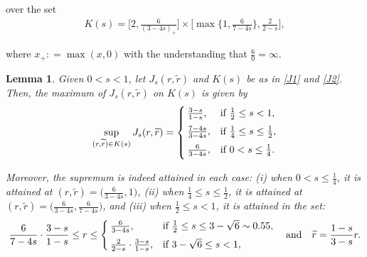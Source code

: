 \documentclass[letterpaper, 11pt,  reqno]{amsart}
\newtheorem{lemma}[theorem]{Lemma}
\newcommand{\1}{\hspace{0.5mm}\text{I}\hspace{0.5mm}}
\newcommand{\noi}{\noindent}
\newcommand{\wt}{\widetilde}
\numberwithin{equation}{section}
\numberwithin{theorem}{section}
\begin{document}
\noi
over the set 
\begin{align}
 K(s)= \bigg[ 2,\frac{6}{(3-4s)_+}\bigg] \times \bigg[\max\Big\{1,\frac{6}{7-4s}\Big\}, \frac{2}{2-s}\bigg],   
\label{J2}
\end{align}


\noi
where $x_+ : = \max(x, 0)$ 
with the understanding that $\frac60 = \infty$.


\begin{lemma}\label{LEM:max} 
Given $0<s<1$, let 
$ J_s(r,\wt r)$ and 
$K(s)$ be as in \eqref{J1} and \eqref{J2}.
Then, the maximum of  $ J_s(r,\wt r)$  on $K(s)$ is given by 
\[  \sup_{(r, \wt r) \in K(s)}  J_s(r, \wt r)
= \begin{cases}
\rule[-3mm]{0pt}{0pt}
 \frac{3-s}{1-s}, & \text{if }  \frac12 \leq s < 1, \\
\rule[-3mm]{0pt}{0pt}
 \frac{7-4s}{3-4s}, & \text{if } \frac14 \le s \le \frac12, \\
\rule[-2.5mm]{0pt}{0pt}
 \frac{6}{3-4s}, & \text{if } 0 < s \le \frac14. 
\end{cases}
\]
%

\noi
Moreover, the supremum is indeed attained in each case:
\textup{(i)} when $0 < s \le \frac14$, it is attained at $(r, \wt r) = \big( \frac{6}{3-4s}, 1\big)$, 
\textup{(ii)} when $\frac14\le s \le \frac12$, it is attained at
$(r, \wt r) = \big( \frac{6}{3-4s}, \frac{6}{7-4s}\big)$, 
and
\textup{(iii)}
when $ \frac 12 \leq s < 1$,  it is attained in the set:
\begin{align}
  \frac{6}{7-4s}\cdot \frac{3-s}{1-s}
\le r \le 
\begin{cases}
\rule[-3mm]{0pt}{0pt}
\frac{6}{3-4s}, &  \text{if } \frac12 \le s \le 3-\sqrt{6}\sim 0.55,   \\
\frac{2}{2-s} \cdot \frac{3-s}{1-s}, & \text{if }  3-\sqrt{6}    \leq s < 1, 
\end{cases}
\quad \text{and}
\quad 
\wt r = \frac{1-s}{3-s} r.
\label{J3}
\end{align}

%
\end{lemma} 
 
\end{document}
